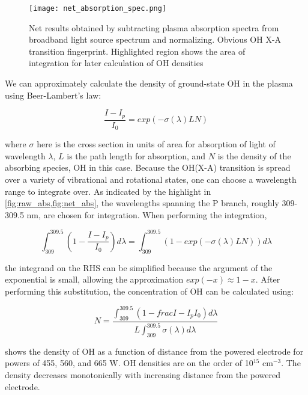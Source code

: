 \begin{figure}[htbp]
  \centering
  \texttt{[image: net\_absorption\_spec.png]}
  \caption{Net results obtained by subtracting plasma absorption spectra from broadband light source spectrum and normalizing. Obvious OH X-A transition fingerprint. Highlighted region shows the area of integration for later calculation of OH densities}
  \label{fig:net_abs}
\end{figure}

We can approximately calculate the density of ground-state OH in the plasma using Beer-Lambert's law:

\begin{equation}
  \frac{I-I_p}{I_0} = exp\left(-\sigma(\lambda) L N\right)
  \label{eq:beer-lambert}
\end{equation}

where $\sigma$ here is the cross section in units of area for absorption of light of wavelength $\lambda$, $L$ is the path length for absorption, and $N$ is the density of the absorbing species, OH in this case. Because the OH(X-A) transition is spread over a variety of vibrational and rotational states, one can choose a wavelength range to integrate over. As indicated by the highlight in \cref{fig:raw_abs,fig:net_abs}, the wavelengths spanning the P branch, roughly 309-309.5 nm, are chosen for integration. When performing the integration,

\begin{equation}
  \int_{309}^{309.5} \left(1 - \frac{I-I_p}{I_0}\right)d\lambda = \int_{309}^{309.5}\left(1 - exp\left(-\sigma(\lambda) L N\right)\right)d\lambda
  \label{eq:int_unsimplified}
\end{equation}

the integrand on the RHS can be simplified because the argument of the exponential is small, allowing the approximation $exp(-x)\approx 1 - x$. After performing this substitution, the concentration of OH can be calculated using:

\begin{equation}
  N = \frac{\int_{309}^{309.5}\left(1 - frac{I-I_p}{I_0}\right)d\lambda}{L\int_{309}^{309.5}\sigma(\lambda)d\lambda}
  \label{eq:int_simp}
\end{equation}

 shows the density of OH as a function of distance from the powered electrode for powers of 455, 560, and 665 W. OH densities are on the order of 10$^{15}$ cm$^{-3}$. The density decreases monotonically with increasing distance from the powered electrode.

